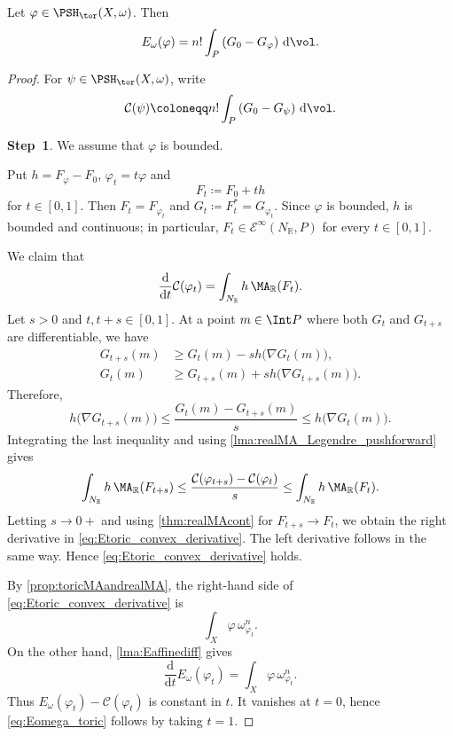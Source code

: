\begin{proposition}\label{prop:Etoric}
    Let $\varphi\in \PSH_{\tor}(X,\omega)$. Then
    \begin{equation}\label{eq:Eomega_toric}
        E_{\omega}(\varphi)=n!\int_P \left(G_{0}-G_{\varphi}\right)\,\mathrm{d}\vol.
    \end{equation}
\end{proposition}
\begin{proof}
    For $\psi\in \PSH_{\tor}(X,\omega)$, write
    \[
        \mathcal C(\psi)\coloneqq n!\int_P\left(G_0-G_\psi\right)\,\mathrm{d}\vol.
    \]

    \textbf{Step~1}. We assume that $\varphi$ is bounded.

    Put $h=F_{\varphi}-F_0$, $\varphi_t=t\varphi$ and
    \[
        F_t\coloneqq F_0+th
    \]
    for $t\in[0,1]$. Then $F_t=F_{\varphi_t}$ and $G_t\coloneqq F_t^*=G_{\varphi_t}$. Since $\varphi$ is bounded, $h$ is bounded and continuous; in particular, $F_t\in \mathcal E^\infty(N_{\mathbb R},P)$ for every $t\in[0,1]$.

    We claim that
    \begin{equation}\label{eq:Etoric_convex_derivative}
        \frac{\mathrm d}{\mathrm dt}\mathcal C(\varphi_t)=\int_{N_{\mathbb R}}h\,\MA_{\mathbb R}(F_t).
    \end{equation}
    Let $s>0$ and $t,t+s\in[0,1]$. At a point $m\in \Int P$ where both $G_t$ and $G_{t+s}$ are differentiable, we have
    \[
        \begin{aligned}
            G_{t+s}(m)&\geq G_t(m)-s h\bigl(\nabla G_t(m)\bigr),\\
            G_t(m)&\geq G_{t+s}(m)+s h\bigl(\nabla G_{t+s}(m)\bigr).
        \end{aligned}
    \]
    Therefore,
    \[
        h\bigl(\nabla G_{t+s}(m)\bigr)\leq \frac{G_t(m)-G_{t+s}(m)}{s}\leq h\bigl(\nabla G_t(m)\bigr).
    \]
    Integrating the last inequality and using \cref{lma:realMA_Legendre_pushforward} gives
    \[
        \int_{N_{\mathbb R}}h\,\MA_{\mathbb R}(F_{t+s})\leq \frac{\mathcal C(\varphi_{t+s})-\mathcal C(\varphi_t)}{s}\leq \int_{N_{\mathbb R}}h\,\MA_{\mathbb R}(F_t).
    \]
    Letting $s\to 0+$ and using \cref{thm:realMAcont} for $F_{t+s}\to F_t$, we obtain the right derivative in \eqref{eq:Etoric_convex_derivative}. The left derivative follows in the same way. Hence \eqref{eq:Etoric_convex_derivative} holds.

    By \cref{prop:toricMAandrealMA}, the right-hand side of \eqref{eq:Etoric_convex_derivative} is
    \[
        \int_X\varphi\,\omega_{\varphi_t}^n.
    \]
    On the other hand, \cref{lma:Eaffinediff} gives
    \[
        \frac{\mathrm d}{\mathrm dt}E_{\omega}(\varphi_t)=\int_X\varphi\,\omega_{\varphi_t}^n.
    \]
    Thus $E_{\omega}(\varphi_t)-\mathcal C(\varphi_t)$ is constant in $t$. It vanishes at $t=0$, hence \eqref{eq:Eomega_toric} follows by taking $t=1$.


\end{proof}
